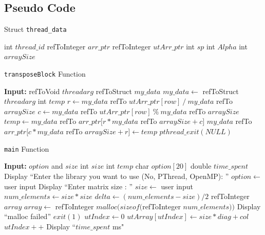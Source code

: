\documentclass[10pt, conference]{IEEEtran}
\def\code#1{\texttt{#1}}
\begin{document}
\onecolumn
\begin{appendices}
\section{Pseudo Code}
\label{Pseudo Appendix}

\begin{algorithm}[h!]
\caption{Struct \code{thread\_data}}
\label{Struct}
\begin{algorithmic} 

\STATE int $thread\_id$
\STATE refToInteger $arr\_ptr$
\STATE refToInteger $utArr\_ptr$
\STATE int $sp$
\STATE int $Alpha$
\STATE int $arraySize$

\end{algorithmic}
\end{algorithm}


\begin{algorithm}[h!]
\caption{\code{transposeBlock} Function}
\label{transposeBlock}
\begin{algorithmic} 
\STATE \textbf{Input:} refToVoid $threadarg$
\STATE
\STATE refToStruct $my\_data$
\STATE $my\_data \leftarrow$ refToStruct $threadarg$
\STATE int $temp$
\STATE
{}
	\STATE $r \leftarrow my\_data$ refTo $utArr\_ptr[row]~ / ~my\_data$ refTo $arraySize$
	\STATE $c \leftarrow my\_data$ refTo $utArr\_ptr[row]~ \% ~my\_data$ refTo $arraySize$
	\STATE $temp \leftarrow my\_data$ refTo $arr\_ptr[r*my\_data$ refTo $arraySize + c]$
	\STATE $my\_data$ refTo $arr\_ptr[c*my\_data$ refTo $arraySize + r] \leftarrow temp$
\ENDFOR
\STATE
\STATE $pthread\_exit(NULL)$

\end{algorithmic}
\end{algorithm}

\begin{algorithm}[h!]
\caption{\code{main} Function}
\label{main}
\begin{algorithmic} 
\STATE \textbf{Input:} $option$ and $size$
\STATE
\STATE int $size$
\STATE int $temp$
\STATE char $option[20]$
\STATE double $time\_spent$
\STATE
\STATE Display ``Enter the library you want to use (No, PThread, OpenMP): ''
\STATE $option \leftarrow$ user input
\STATE Display ``Enter matrix size : ''
\STATE $size \leftarrow$ user input
\STATE
\STATE $num\_elements \leftarrow size*size$
\STATE $delta \leftarrow (num\_elements - size)/2$
\STATE refToInteger $array$
\STATE $array \leftarrow$ refToInteger $malloc(sizeof($refToInteger $num\_elements))$
\STATE
{}
	\STATE Display ``malloc failed''
	\STATE $exit(1)$
\ENDIF
\STATE
\STATE $utIndex \leftarrow 0$
		\STATE $utArray[utIndex] \leftarrow size*diag + col$
		\STATE $utIndex++$
	\ENDFOR
\ENDFOR
\STATE
\STATE Display ``$time\_spent$ ms"


\end{algorithmic}
\end{algorithm}
\end{appendices}
\end{document}
